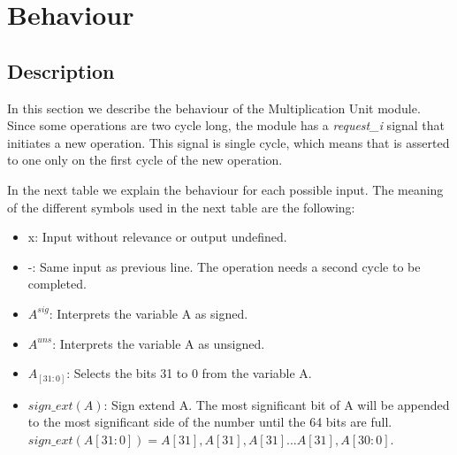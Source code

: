 \section{Behaviour}

\subsection{Description}

In this section we describe the behaviour of the Multiplication Unit module. Since some operations are two cycle long, the module has a \textit{request\_i} signal that initiates a new operation. This signal is single cycle, which means that is asserted to one only on the first cycle of the new operation.

In the next table we explain the behaviour for each possible input.
The meaning of the different symbols used in the next table are the following:

\begin{itemize}
    \item x: Input without relevance or output undefined.
    \item -: Same input as previous line. The operation needs a second cycle to be completed.
    \item $A^{sig}$: Interprets the variable A as signed.
    \item $A^{uns}$: Interprets the variable A as unsigned.
    \item $A_{[31:0]}$: Selects the bits 31 to 0 from the variable A.
    \item $sign\_ext(A)$: Sign extend A. The most significant bit of A will be appended to the most significant side of the number until the 64 bits are full. \\
    $sign\_ext(A[31:0]) = A[31],A[31],A[31]...A[31],A[30:0]$.
\end{itemize}

